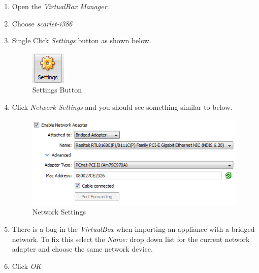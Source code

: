 \documentclass[pdftex,11pt,letterpaper]{article}
\begin{document}
\begin{enumerate}

\item Open the \textit{VirtualBox Manager}.
\item Choose \textit{scarlet-i386}
\item Single Click \textit{Settings} button as shown below.

    \begin{figure}[H]
        \begin{center}
        \leavevmode
            \includegraphics[]{scarlet_images/settings_button.png}
        \end{center}
        \caption{Settings Button}
        \label{fig:settings_button}
    \end{figure}
    
\item Click \textit{Network Settings} and you should see something similar to below.

    \begin{figure}[H]
        \begin{center}
        \leavevmode
            \includegraphics[]{scarlet_images/network_settings.png}
        \end{center}
        \caption{Network Settings}
        \label{fig:network_settings}
    \end{figure}
    
\item There is a bug in the \textit{VirtualBox} when importing an appliance with a bridged network.  To fix this select the \textit{Name:} drop down list for the current network adapter and choose the same network device.

\item Click \textit{OK}

\end{enumerate}
\end{document}
